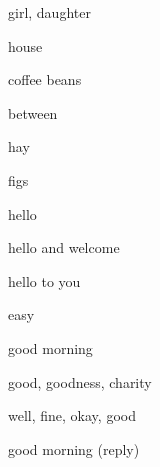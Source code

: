 

\begin{flashcard}{\LARGE girl, daughter}
\LARGE {}
\end{flashcard}
\begin{flashcard}{\LARGE house}
\LARGE {}
\end{flashcard}
\begin{flashcard}{\LARGE coffee beans}
\LARGE {}
\end{flashcard}
\begin{flashcard}{\LARGE between}
\LARGE {}
\end{flashcard}
\begin{flashcard}{\LARGE hay}
\LARGE {}
\end{flashcard}
\begin{flashcard}{\LARGE figs}
\LARGE {}
\end{flashcard}
\begin{flashcard}{\LARGE hello}
\LARGE {}
\end{flashcard}
\begin{flashcard}{\LARGE hello and welcome}
\LARGE {}
\end{flashcard}
\begin{flashcard}{\LARGE hello to you}
\LARGE {}
\end{flashcard}
\begin{flashcard}{\LARGE easy}
\LARGE {}
\end{flashcard}
\begin{flashcard}{\LARGE good morning}
\LARGE {}
\end{flashcard}
\begin{flashcard}{\LARGE good, goodness, charity}
\LARGE {}
\end{flashcard}
\begin{flashcard}{\LARGE well, fine, okay, good}
\LARGE {}
\end{flashcard}
\begin{flashcard}{\LARGE good morning (reply)}
\LARGE {}
\end{flashcard}
